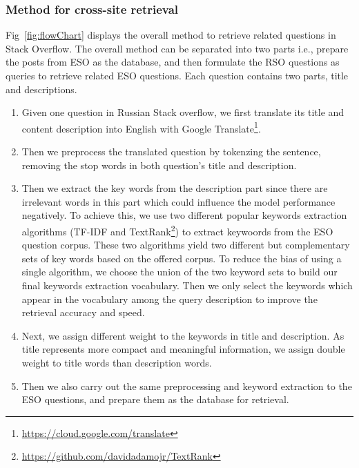 \subsubsection{Method for cross-site retrieval}
Fig~\ref{fig:flowChart} displays the overall method to retrieve related questions in Stack Overflow.
The overall method can be separated into two parts i.e., prepare the posts from  ESO as the database, and then formulate the RSO questions as queries to retrieve related ESO questions.
Each question contains two parts, title and descriptions.
\begin{enumerate}
 \item Given one question in Russian Stack overflow, we first translate its title and content description into English with Google Translate\footnote{\url{https://cloud.google.com/translate}}.
 \item Then we preprocess the translated question by tokenzing the sentence, removing the stop words in both question's title and description.
 \item Then we extract the key words from the description part since there are irrelevant words in this part which could influence the model performance negatively. 
     To achieve this, we use two different popular keywords extraction algorithms (TF-IDF and TextRank\footnote{\url{https://github.com/davidadamojr/TextRank}}) to extract keywoords from the ESO question corpus. These two algorithms yield two different but 		     complementary sets of key words based on the offered corpus. To reduce the bias of using a single algorithm, we choose the union of the two keyword sets to build our final keywords extraction       	     vocabulary.
     Then we only select the keywords which appear in the vocabulary among the query description to improve the retrieval accuracy and speed.
 \item Next, we assign different weight to the keywords in title and description. As title represents more compact and meaningful information, we assign double weight to title words than description words.
 \item Then we also carry out the same preprocessing and keyword extraction to the ESO questions, and prepare them as the database for retrieval.

\end{enumerate}
